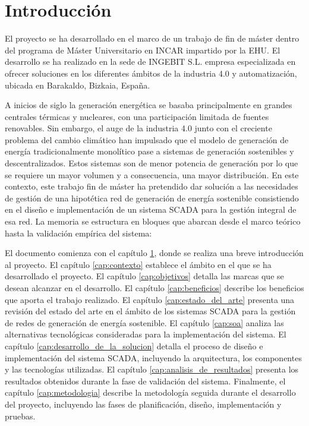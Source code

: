 \chapter{Introducción}
\label{cap:introduccion}
El proyecto se ha desarrollado en el marco de un trabajo de fin de máster dentro del programa de Máster Universitario en \ac{INCAR} impartido por la \ac{EHU}. El desarrollo se ha realizado en la sede de INGEBIT S.L. empresa especializada en ofrecer soluciones en los diferentes ámbitos de la industria 4.0 y automatización, ubicada en Barakaldo, Bizkaia, España. \par

A inicios de siglo la generación energética se basaba principalmente en grandes centrales térmicas y nucleares, con una participación limitada de fuentes renovables. Sin embargo, el auge de la industria 4.0  junto con el creciente problema del cambio climático han impulsado que el modelo de generación de energía tradicionalmente monolítico pase a sistemas de generación sostenibles y descentralizados. Estos sistemas son de menor potencia de generación por lo que se requiere un mayor volumen y a consecuencia, una mayor distribución. En este contexto, este trabajo fin de máster ha pretendido dar solución a las necesidades de gestión de una hipotética red de generación de energía sostenible consistiendo en el diseño e implementación de un sistema \ac{SCADA} para la gestión integral de esa red. La memoria se estructura en bloques que abarcan desde el marco teórico hasta la validación empírica del sistema:\par 

El documento comienza con el capítulo \ref{cap:introduccion}, donde se realiza una breve introducción al proyecto. El capítulo \ref{cap:contexto} establece el ámbito en el que se ha desarrollado el proyecto. El capítulo \ref{cap:objetivos} detalla las marcas que se desean alcanzar en el desarrollo. El capítulo \ref{cap:beneficios} describe los beneficios que aporta el trabajo realizado. El capítulo \ref{cap:estado_del_arte} presenta una revisión del estado del arte en el ámbito de los sistemas \ac{SCADA} para la gestión de redes de generación de energía sostenible. El capítulo \ref{cap:soa} analiza las alternativas tecnológicas consideradas para la implementación del sistema. El capítulo \ref{cap:desarrollo_de_la_solucion} detalla el proceso de diseño e implementación del sistema \ac{SCADA}, incluyendo la arquitectura, los componentes y las tecnologías utilizadas. El capítulo \ref{cap:analisis_de_resultados} presenta los resultados obtenidos durante la fase de validación del sistema. Finalmente, el capítulo \ref{cap:metodologia} describe la metodología seguida durante el desarrollo del proyecto, incluyendo las fases de planificación, diseño, implementación y pruebas.\par

